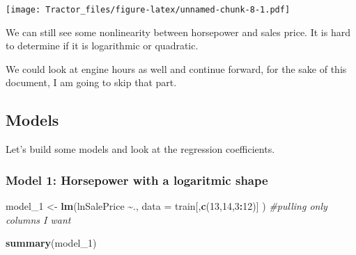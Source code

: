 \documentclass[
]{article}
\newenvironment{Shaded}{\begin{snugshade}}{\end{snugshade}}
\newcommand{\AttributeTok}[1]{\textcolor[rgb]{0.13,0.29,0.53}{#1}}
\newcommand{\CommentTok}[1]{\textcolor[rgb]{0.56,0.35,0.01}{\textit{#1}}}
\newcommand{\DecValTok}[1]{\textcolor[rgb]{0.00,0.00,0.81}{#1}}
\newcommand{\FunctionTok}[1]{\textcolor[rgb]{0.13,0.29,0.53}{\textbf{#1}}}
\newcommand{\NormalTok}[1]{#1}
\newcommand{\OtherTok}[1]{\textcolor[rgb]{0.56,0.35,0.01}{#1}}
\newcommand{\SpecialCharTok}[1]{\textcolor[rgb]{0.81,0.36,0.00}{\textbf{#1}}}
\begin{document}
\texttt{[image: Tractor\_files/figure-latex/unnamed-chunk-8-1.pdf]}

We can still see some nonlinearity between horsepower and sales price.
It is hard to determine if it is logarithmic or quadratic.

\begin{Shaded}
\end{Shaded}

We could look at engine hours as well and continue forward, for the sake
of this document, I am going to skip that part.

\subsection{Models}\label{models}

Let's build some models and look at the regression coefficients.

\subsubsection{Model 1: Horsepower with a logaritmic
shape}\label{model-1-horsepower-with-a-logaritmic-shape}

\begin{Shaded}
\begin{Highlighting}[]
\NormalTok{model\_1 }\OtherTok{\textless{}{-}} \FunctionTok{lm}\NormalTok{(lnSalePrice }\SpecialCharTok{\textasciitilde{}}\NormalTok{., }\AttributeTok{data =}\NormalTok{ train[,}\FunctionTok{c}\NormalTok{(}\DecValTok{13}\NormalTok{,}\DecValTok{14}\NormalTok{,}\DecValTok{3}\SpecialCharTok{:}\DecValTok{12}\NormalTok{)] ) }\CommentTok{\#pulling only columns I want}

\FunctionTok{summary}\NormalTok{(model\_1)}
\end{Highlighting}
\end{Shaded}
\end{document}
